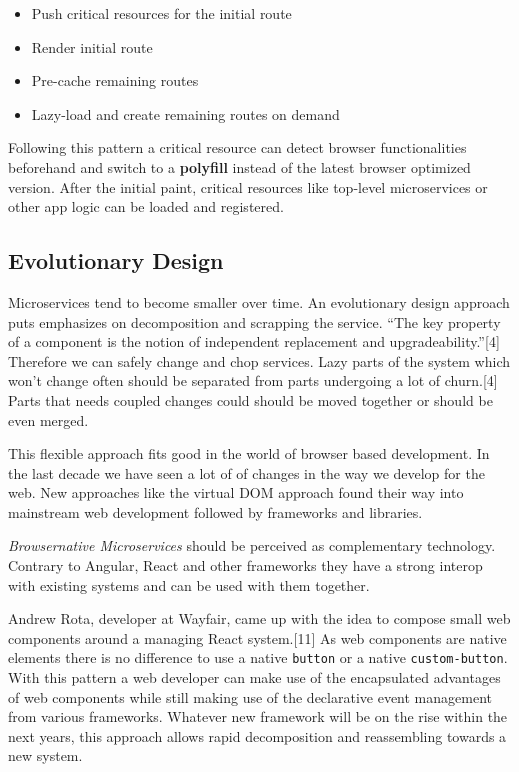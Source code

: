 \documentclass[]{article}
\providecommand{\tightlist}{%
  \setlength{\itemsep}{0pt}\setlength{\parskip}{0pt}}
\begin{document}
\begin{itemize}
\tightlist
\item
  Push critical resources for the initial route
\item
  Render initial route
\item
  Pre-cache remaining routes
\item
  Lazy-load and create remaining routes on demand
\end{itemize}

Following this pattern a critical resource can detect browser
functionalities beforehand and switch to a \textbf{polyfill} instead of
the latest browser optimized version. After the initial paint, critical
resources like top-level microservices or other app logic can be loaded
and registered.

\subsection{Evolutionary Design}\label{evolutionary-design}

Microservices tend to become smaller over time. An evolutionary design
approach puts emphasizes on decomposition and scrapping the service.
``The key property of a component is the notion of independent
replacement and upgradeability.''{[}4{]} Therefore we can safely change
and chop services. Lazy parts of the system which won't change often
should be separated from parts undergoing a lot of churn.{[}4{]} Parts
that needs coupled changes could should be moved together or should be
even merged.

This flexible approach fits good in the world of browser based
development. In the last decade we have seen a lot of of changes in the
way we develop for the web. New approaches like the virtual DOM approach
found their way into mainstream web development followed by frameworks
and libraries.

\emph{Browsernative Microservices} should be perceived as complementary
technology. Contrary to Angular, React and other frameworks they have a
strong interop with existing systems and can be used with them together.

Andrew Rota, developer at Wayfair, came up with the idea to compose
small web components around a managing React system.{[}11{]} As web
components are native elements there is no difference to use a native
\texttt{button} or a native \texttt{custom-button}. With this pattern a
web developer can make use of the encapsulated advantages of web
components while still making use of the declarative event management
from various frameworks. Whatever new framework will be on the rise
within the next years, this approach allows rapid decomposition and
reassembling towards a new system.
\end{document}
